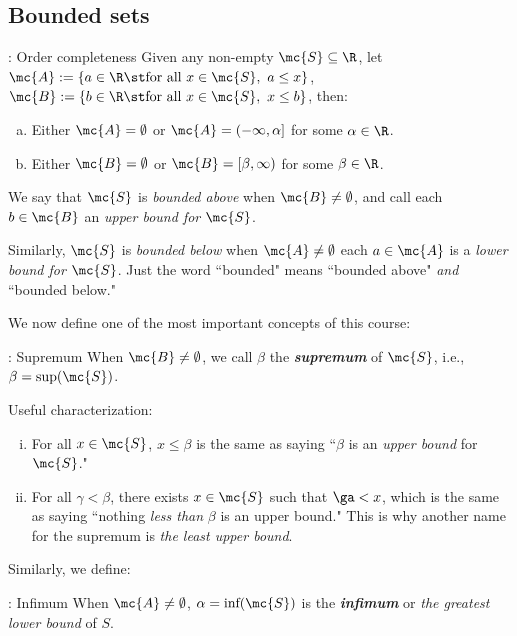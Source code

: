 \subsection{Bounded sets}
\begin{ntheorem}{: Order completeness}
	Given any non-empty \(\mc{S}\subseteq\R\), let \(\mc{A}:=\{a\in\R\st\text{for all}~x\in \mc{S},~a\leq x\}\), \(\mc{B}:=\{b\in\R\st\text{for all}~x\in \mc{S},~x\leq b\}\), then:
	\begin{enumerate}[(a)]
		\item Either \(\mc{A}=\emptyset\) or \(\mc{A}=(-\infty,\alpha]\) for some \(\alpha\in\R\).
		
		\item Either \(\mc{B}=\emptyset\) or \(\mc{B}=[\beta,\infty)\) for some \(\beta\in\R\).
	\end{enumerate}
\end{ntheorem} 
We say that \(\mc{S}\) is \emph{bounded above} when \(\mc{B}\neq\emptyset\), and call each \(b\in \mc{B}\) an \emph{upper bound for \(\mc{S}\)}.

\medskip

Similarly, \(\mc{S}\) is \emph{bounded below} when \(\mc{A}\neq\emptyset\) each \(a\in \mc{A}\) is a \emph{lower bound for \(\mc{S}\)}. Just the word ``bounded" means ``bounded above" \emph{and} ``bounded below."

\medskip

We now define one of the most important concepts of this course:
\begin{ndef}{: Supremum}
	When \(\mc{B}\neq\emptyset\), we call \(\beta\) the \emph{\textbf{supremum}} of \(\mc{S}\), i.e., \(\beta=\text{sup}(\mc{S})\).
	
	\medskip
	
	Useful characterization:
	\begin{enumerate}[(i)]
		\item For all \(x\in \mc{S}\), \(x\leq \beta\) is the same as saying ``\(\beta\) is an \emph{upper bound} for \(\mc{S}\)."
		
		\item For all \(\gamma<\beta\), there exists \(x\in \mc{S}\) such that \(\ga<x\), which is the same as saying ``nothing \emph{less than} \(\beta\) is an upper bound." This is why another name for the supremum is \emph{the least upper bound}.
	\end{enumerate}
\end{ndef}
Similarly, we define:
\begin{ndef}{: Infimum}
	When \(\mc{A}\neq\emptyset\), \(\alpha=\text{inf}(\mc{S})\) is the \emph{\textbf{infimum}} or \emph{the greatest lower bound} of \(S\).
\end{ndef}
